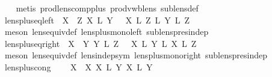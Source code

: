 \begin{isabellebody}
%
\isadelimproof
\ \ %
\endisadelimproof
%
\isatagproof
{}\isamarkupfalse%
\ {\isacharparenleft}metis\ prod{\isacharunderscore}lens{\isacharunderscore}comp{\isacharunderscore}plus\ prod{\isacharunderscore}vwb{\isacharunderscore}lens\ sublens{\isacharunderscore}def{\isacharparenright}%
\endisatagproof
{\isafoldproof}%
%
\isadelimproof
\isanewline
%
\endisadelimproof
\isanewline
\ \ \ \ \ \ \isanewline
{}\isamarkupfalse%
\ lens{\isacharunderscore}plus{\isacharunderscore}eq{\isacharunderscore}left{\isacharcolon}\ {\isachardoublequoteopen}{\isasymlbrakk}\ X\ {\isasymbowtie}\ Z{\isacharsemicolon}\ X\ {\isasymapprox}\isactrlsub L\ Y\ {\isasymrbrakk}\ {\isasymLongrightarrow}\ X\ {\isacharplus}\isactrlsub L\ Z\ {\isasymapprox}\isactrlsub L\ Y\ {\isacharplus}\isactrlsub L\ Z{\isachardoublequoteclose}\isanewline
%
\isadelimproof
\ \ %
\endisadelimproof
%
\isatagproof
{}\isamarkupfalse%
\ {\isacharparenleft}meson\ lens{\isacharunderscore}equiv{\isacharunderscore}def\ lens{\isacharunderscore}plus{\isacharunderscore}mono{\isacharunderscore}left\ sublens{\isacharunderscore}pres{\isacharunderscore}indep{\isacharparenright}%
\endisatagproof
{\isafoldproof}%
%
\isadelimproof
\isanewline
%
\endisadelimproof
\isanewline
{}\isamarkupfalse%
\ lens{\isacharunderscore}plus{\isacharunderscore}eq{\isacharunderscore}right{\isacharcolon}\ {\isachardoublequoteopen}{\isasymlbrakk}\ X\ {\isasymbowtie}\ Y{\isacharsemicolon}\ Y\ {\isasymapprox}\isactrlsub L\ Z\ {\isasymrbrakk}\ {\isasymLongrightarrow}\ X\ {\isacharplus}\isactrlsub L\ Y\ {\isasymapprox}\isactrlsub L\ X\ {\isacharplus}\isactrlsub L\ Z{\isachardoublequoteclose}\isanewline
%
\isadelimproof
\ \ %
\endisadelimproof
%
\isatagproof
{}\isamarkupfalse%
\ {\isacharparenleft}meson\ lens{\isacharunderscore}equiv{\isacharunderscore}def\ lens{\isacharunderscore}indep{\isacharunderscore}sym\ lens{\isacharunderscore}plus{\isacharunderscore}mono{\isacharunderscore}right\ sublens{\isacharunderscore}pres{\isacharunderscore}indep{\isacharparenright}%
\endisatagproof
{\isafoldproof}%
%
\isadelimproof
\isanewline
%
\endisadelimproof
\ \ \ \ \ \ \isanewline
{}\isamarkupfalse%
\ lens{\isacharunderscore}plus{\isacharunderscore}cong{\isacharcolon}\ \isanewline
\ \ \ {\isachardoublequoteopen}X\ {\isasymbowtie}\ X\ {\isachardoublequoteopen}X\ {\isasymapprox}\isactrlsub L\ Y\ {\isachardoublequoteopen}X\ {\isasymapprox}\isactrlsub L\ Y\isanewline

\end{isabellebody}
